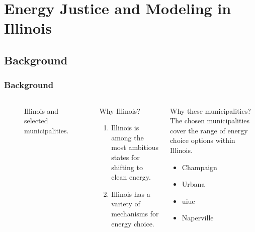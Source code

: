 \section{Energy Justice and Modeling in Illinois}

\subsection{Background}


\begin{frame}
    \frametitle{Background}
        
    \begin{columns}
        \column[t]{2.5cm}
        \begin{figure}
            \centering
            \resizebox{\columnwidth}{!}{}
            \caption{Illinois and selected municipalities.}
            \label{fig:illinois}
        \end{figure}
        \column[t]{7.5cm}
        \begin{block}{Why Illinois?}
            \begin{enumerate}[<+->]
                \item Illinois is among the most ambitious states for shifting
                to clean energy.
                \item Illinois has a variety of mechanisms for energy choice.
            \end{enumerate}
        \end{block}
        \begin{block}{Why these municipalities?}
            The chosen municipalities cover the range of energy choice options
            within Illinois.
            \begin{itemize}[<+->]
                \item Champaign
                \item Urbana
                \item \gls{uiuc}
                \item Naperville
            \end{itemize}
        \end{block}
    \end{columns}
\end{frame}

